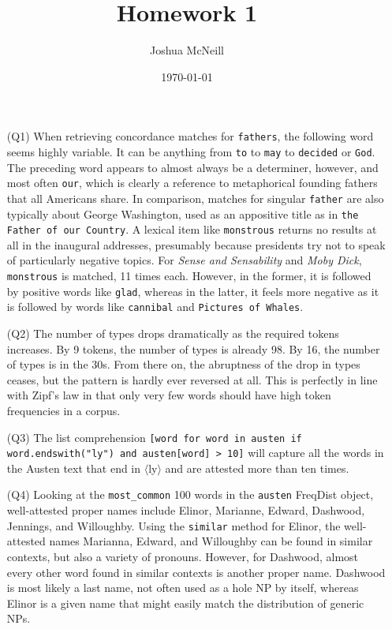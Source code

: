 \documentclass{article}
\title{Homework 1}
\author{Joshua McNeill}
\date{\today}
\begin{document}
  \maketitle
  \begin{itemize}
    \item[(Q1)] When retrieving concordance matches for \texttt{fathers}, the following word seems highly variable. It can be anything from \texttt{to} to \texttt{may} to \texttt{decided} or \texttt{God}. The preceding word appears to almost always be a determiner, however, and most often \texttt{our}, which is clearly a reference to metaphorical founding fathers that all Americans share. In comparison, matches for singular \texttt{father} are also typically about George Washington, used as an appositive title as in \texttt{the Father of our Country}. A lexical item like \texttt{monstrous} returns no results at all in the inaugural addresses, presumably because presidents try not to speak of particularly negative topics. For \textit{Sense and Sensability} and \textit{Moby Dick}, \texttt{monstrous} is matched, 11 times each. However, in the former, it is followed by positive words like \texttt{glad}, whereas in the latter, it feels more negative as it is followed by words like \texttt{cannibal} and \texttt{Pictures of Whales}.
    \item[(Q2)] The number of types drops dramatically as the required tokens increases. By 9 tokens, the number of types is already 98. By 16, the number of types is in the 30s. From there on, the abruptness of the drop in types ceases, but the pattern is hardly ever reversed at all. This is perfectly in line with Zipf's law in that only very few words should have high token frequencies in a corpus.
    \item[(Q3)] The list comprehension \lstinline|[word for word in austen if word.endswith("ly") and austen[word] > 10]| will capture all the words in the Austen text that end in $\langle$ly$\rangle$ and are attested more than ten times.
    \item[(Q4)] Looking at the \texttt{most\_common} 100 words in the \texttt{austen} FreqDist object, well-attested proper names include Elinor, Marianne, Edward, Dashwood, Jennings, and Willoughby. Using the \texttt{similar} method for Elinor, the well-attested names Marianna, Edward, and Willoughby can be found in similar contexts, but also a variety of pronouns. However, for Dashwood, almost every other word found in similar contexts is another proper name. Dashwood is most likely a last name, not often used as a hole NP by itself, whereas Elinor is a given name that might easily match the distribution of generic NPs.

\end{itemize}
\end{document}
